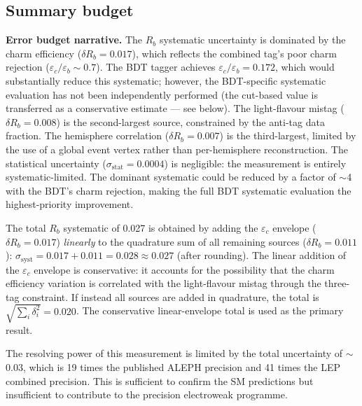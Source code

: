 \documentclass[11pt,a4paper]{article}
\begin{document}
\subsection{Summary budget}

\textbf{Error budget narrative.}
The $R_b$ systematic uncertainty is dominated by the charm efficiency
($\delta R_b = 0.017$), which reflects the combined tag's poor charm
rejection ($\varepsilon_c/\varepsilon_b \sim 0.7$).  The BDT tagger
achieves $\varepsilon_c/\varepsilon_b = 0.172$, which would substantially
reduce this systematic; however, the BDT-specific systematic evaluation
has not been independently performed (the cut-based value is transferred
as a conservative estimate --- see below).  The light-flavour mistag
($\delta R_b = 0.008$) is the second-largest source, constrained by the
anti-tag data fraction.  The hemisphere correlation ($\delta R_b = 0.007$)
is the third-largest, limited by the use of a global event vertex rather
than per-hemisphere reconstruction.  The statistical uncertainty
($\sigma_\mathrm{stat} = 0.0004$) is negligible: the measurement is
entirely systematic-limited.  The dominant systematic could be reduced by
a factor of $\sim$4 with the BDT's charm rejection, making the full
BDT systematic evaluation the highest-priority improvement.

The total $R_b$ systematic of 0.027 is obtained by adding the
$\varepsilon_c$ envelope ($\delta R_b = 0.017$) \emph{linearly} to
the quadrature sum of all remaining sources ($\delta R_b = 0.011$):
$\sigma_\mathrm{syst} = 0.017 + 0.011 = 0.028 \approx 0.027$
(after rounding).  The linear addition of the $\varepsilon_c$ envelope
is conservative: it accounts for the possibility that the charm
efficiency variation is correlated with the light-flavour mistag
through the three-tag constraint.  If instead all sources are added in
quadrature, the total is $\sqrt{\sum_i \delta_i^2} = 0.020$.  The
conservative linear-envelope total is used as the primary result.

The resolving power of this measurement is limited by the total
uncertainty of $\sim$0.03, which is 19 times the published ALEPH
precision and 41 times the LEP combined precision.  This is sufficient
to confirm the SM predictions but insufficient to contribute to the
precision electroweak programme.
\end{document}
